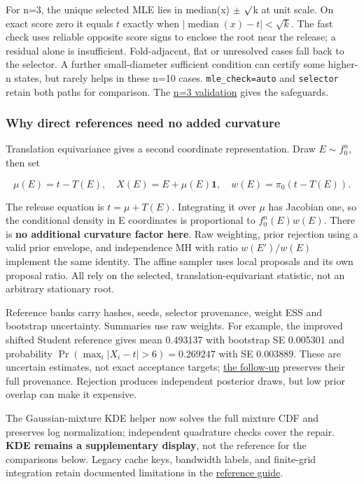 \documentclass[
  10pt,
]{article}
\begin{document}
For n=3, the unique selected MLE lies in median(x) \ensuremath{\pm} \ensuremath{\surd}k at unit scale.
On exact score zero it equals \(t\) exactly when
\(|\operatorname{median}(x)-t|<\sqrt{k}\). The fast check uses reliable
opposite score signs to enclose the root near the release; a residual
alone is insufficient. Fold-adjacent, flat or unresolved cases fall back
to the selector. A further small-diameter sufficient condition can
certify some higher-n states, but rarely helps in these n=10 cases.
\texttt{mle\_check=\textquotesingle{}auto\textquotesingle{}} and
\texttt{\textquotesingle{}selector\textquotesingle{}} retain both paths
for comparison. The \href{student_n3_fast_path_validation.md}{n=3
validation} gives the safeguards.

\subsubsection{Why direct references need no added
curvature}\label{why-direct-references-need-no-added-curvature}

Translation equivariance gives a second coordinate representation. Draw
\(E\sim f_0^n\), then set

\[
\mu(E)=t-T(E),\quad X(E)=E+\mu(E)\mathbf1,\quad
w(E)=\pi_0(t-T(E)).
\]

The release equation is \(t=\mu+T(E)\). Integrating it over \(\mu\) has
Jacobian one, so the conditional density in E coordinates is
proportional to \(f_0^n(E)w(E)\). There is \textbf{no additional
curvature factor here}. Raw weighting, prior rejection using a valid
prior envelope, and independence MH with ratio \(w(E')/w(E)\) implement
the same identity. The affine sampler uses local proposals and its own
proposal ratio. All rely on the selected, translation-equivariant
statistic, not an arbitrary stationary root.

Reference banks carry hashes, seeds, selector provenance, weight ESS and
bootstrap uncertainty. Summaries use raw weights. For example, the
improved shifted Student reference gives mean 0.493137 with bootstrap SE
0.005301 and probability \(\Pr(\max_i|X_i-t|>6)=0.269247\) with SE
0.003889. These are uncertain estimates, not exact acceptance targets;
\href{shifted_student_reference_followup.md}{the follow-up} preserves
their full provenance. Rejection produces independent posterior draws,
but low prior overlap can make it expensive.

The Gaussian-mixture KDE helper now solves the full mixture CDF and
preserves log normalization; independent quadrature checks cover the
repair. \textbf{KDE remains a supplementary display}, not the reference
for the comparisons below. Legacy cache keys, bandwidth labels, and
finite-grid integration retain documented limitations in the
\href{../../kde_ref/README.md}{reference guide}.
\end{document}
